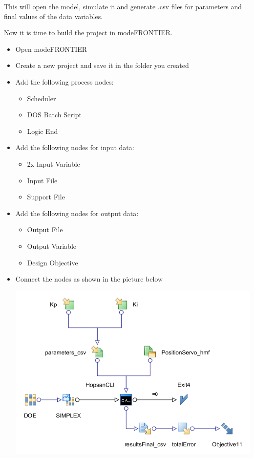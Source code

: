 \documentclass[a4paper]{article}
\begin{document}
\begin{tutenumerate}
This will open the model, simulate it and generate .csv files for parameters and final values of the data variables.


Now it is time to build the project in modeFRONTIER.

\begin{itemize}
\item Open modeFRONTIER
\item Create a new project and save it in the folder you created
\item Add the following process nodes:
\begin{itemize}
\item Scheduler
\item DOS Batch Script
\item Logic End
\end{itemize}
\item Add the following nodes for input data:
\begin{itemize}
\item 2x Input Variable
\item Input File
\item Support File
\end{itemize}
\item Add the following nodes for output data:
\begin{itemize}
\item Output File
\item Output Variable
\item Design Objective
\end{itemize}
\item Connect the nodes as shown in the picture below
\begin{center}
\includegraphics[scale=0.52]{gfx/modefrontier/model_final.png}\\
\end{center}
\end{itemize}



\end{tutenumerate}
\end{document}
